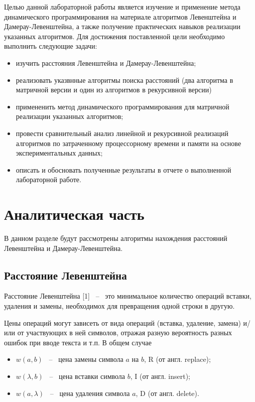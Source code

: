 \documentclass[a4paper,14pt, unknownkeysallowed]{extreport}
\begin{document}
Целью данной лабораторной работы является изучение и применение метода динамического программирования на материале алгоритмов Левенштейна и Дамерау-Левенштейна, а также получение практических навыков реализации указанных алгоритмов. Для достижения поставленной цели необходимо выполнить следующие задачи:

\begin{itemize}
	\item изучить расстояния Левенштейна и Дамерау-Левенштейна;
	\item реализовать указвнные алгоритмы поиска расстояний (два алгоритма в матричной версии и один из алгоритмов в рекурсивной версии)
	\item примененить метод динамического программирования для матричной реализации указанных алгоритмов; 
	\item провести сравнительный анализ линейной и рекурсивной реализаций алгоритмов по затраченному процессорному времени и памяти на основе экспериментальных данных;
	\item описать и обосновать полученные результаты в отчете о выполненной лабораторной работе.
\end{itemize}





\chapter{Аналитическая часть}

В данном разделе будут рассмотрены алгоритмы нахождения расстояний Левенштейна и Дамерау-Левенштейна.

\section{Расстояние Левенштейна}

Расстояние Левенштейна [1] ~--~ это минимальное количество операций вставки, удаления и замены, необходимох для превращения одной строки в другую.

Цены операций могут зависеть от вида операций (вставка, удаление, замена) и/или от участвующих в ней символов, отражая разную вероятность разных ошибок при вводе текста и т.п. В общем случае

\begin{itemize}
	\item $w(a, b)$ ~--~ цена замены символа $a$ на $b$, R (от англ. replace);
	\item $w(\lambda, b)$ ~--~ цена вставки символа $b$, I (от англ. insert);
	\item $w(a, \lambda)$ ~--~ цена удаления символа $a$, D (от англ. delete).
\end{itemize}
\end{document}
